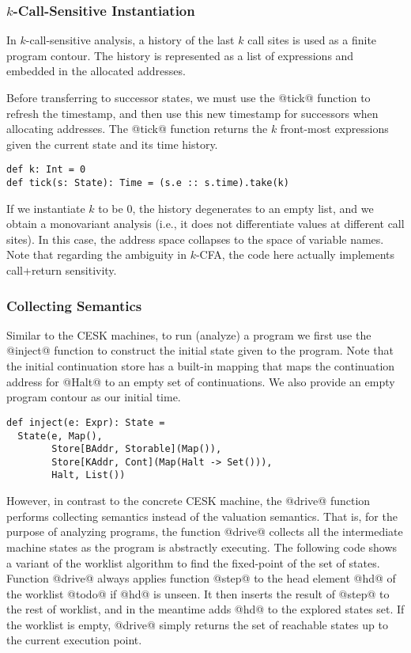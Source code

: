 \documentclass[acmsmall]{acmart}\settopmatter{}
\begin{document}
\subsubsection{$k$-Call-Sensitive Instantiation} \label{kcfainst}

In $k$-call-sensitive analysis, a history of the last $k$ call sites is used as a 
finite program contour. The history is represented as a list of expressions and embedded
in the allocated addresses.

Before transferring to successor states, we must use the @tick@ function to refresh the 
timestamp, and then use this new timestamp for successors when allocating addresses.
The @tick@ function returns the $k$ front-most expressions given the current state and its
time history.

\begin{lstlisting}
def k: Int = 0
def tick(s: State): Time = (s.e :: s.time).take(k)
\end{lstlisting}

If we instantiate $k$ to be $0$, the history degenerates to an empty list, and we obtain
a monovariant analysis (i.e., it does not differentiate values at different call sites).
In this case, the address space collapses to the space of variable names.
Note that regarding the ambiguity in $k$-CFA\cite{Gilray:2016:ACP:2951913.2951936},
the code here actually implements call+return sensitivity.

\subsubsection{Collecting Semantics}

Similar to the CESK machines, to run (analyze) a program we first use the @inject@ function
to construct the initial state given to the program. Note that the initial continuation store
has a built-in mapping that maps the continuation address for @Halt@ to an empty set of 
continuations. We also provide an empty program contour as our initial time.

\begin{lstlisting}
def inject(e: Expr): State =
  State(e, Map(),
        Store[BAddr, Storable](Map()),
        Store[KAddr, Cont](Map(Halt -> Set())),
        Halt, List())
\end{lstlisting}

However, in contrast to the concrete CESK machine, the @drive@ function performs 
collecting semantics instead of the valuation semantics. That is, for the purpose of
analyzing programs, the function @drive@ collects all the intermediate machine states 
as the program is abstractly executing. The following code shows a variant of the 
worklist algorithm to find the fixed-point of the set of states.
Function @drive@ always applies function @step@ to the head element @hd@ of
the worklist @todo@ if @hd@ is unseen. It then inserts the result of @step@ to
the rest of worklist, and in the meantime adds @hd@ to the explored states set.
If the worklist is empty, @drive@ simply returns the set of reachable states
up to the current execution point.
\end{document}
